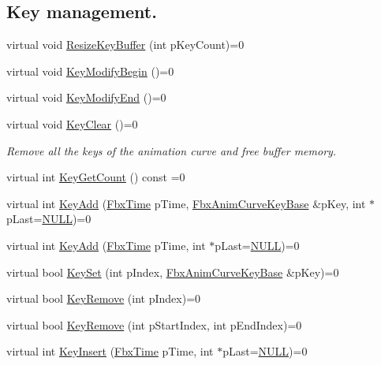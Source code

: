 \subsection*{Key management.}
\begin{DoxyCompactItemize}
\item 
virtual void \hyperlink{class_fbx_anim_curve_ad116802320381f4217d32dde6006643b}{Resize\+Key\+Buffer} (int p\+Key\+Count)=0
\item 
virtual void \hyperlink{class_fbx_anim_curve_ac75a9aaa2edc08635c0a9fadbd628923}{Key\+Modify\+Begin} ()=0
\item 
virtual void \hyperlink{class_fbx_anim_curve_ae8776e18ed1933e258774ba44f64fe5d}{Key\+Modify\+End} ()=0
\item 
virtual void \hyperlink{class_fbx_anim_curve_a202883ab5e1844beb60d40137464afd8}{Key\+Clear} ()=0
\begin{DoxyCompactList}\small\item\em Remove all the keys of the animation curve and free buffer memory. \end{DoxyCompactList}\item 
virtual int \hyperlink{class_fbx_anim_curve_a08de74d6ef6469be37abd1df0836eac9}{Key\+Get\+Count} () const =0
\item 
virtual int \hyperlink{class_fbx_anim_curve_aefac9bf8a5d7bf1fe147e192ba503737}{Key\+Add} (\hyperlink{class_fbx_time}{Fbx\+Time} p\+Time, \hyperlink{class_fbx_anim_curve_key_base}{Fbx\+Anim\+Curve\+Key\+Base} \&p\+Key, int $\ast$p\+Last=\hyperlink{fbxarch_8h_a070d2ce7b6bb7e5c05602aa8c308d0c4}{N\+U\+LL})=0
\item 
virtual int \hyperlink{class_fbx_anim_curve_a96e4e0437fc18712b785e7370ab5184e}{Key\+Add} (\hyperlink{class_fbx_time}{Fbx\+Time} p\+Time, int $\ast$p\+Last=\hyperlink{fbxarch_8h_a070d2ce7b6bb7e5c05602aa8c308d0c4}{N\+U\+LL})=0
\item 
virtual bool \hyperlink{class_fbx_anim_curve_a8f36f89bd5fbaa4f180789f4d9faf84f}{Key\+Set} (int p\+Index, \hyperlink{class_fbx_anim_curve_key_base}{Fbx\+Anim\+Curve\+Key\+Base} \&p\+Key)=0
\item 
virtual bool \hyperlink{class_fbx_anim_curve_a083206eda111aa4c6803410427a4645c}{Key\+Remove} (int p\+Index)=0
\item 
virtual bool \hyperlink{class_fbx_anim_curve_a7b4fe494d1ca4575bb253ec89f867df1}{Key\+Remove} (int p\+Start\+Index, int p\+End\+Index)=0
\item 
virtual int \hyperlink{class_fbx_anim_curve_aaad0086794bde7063d868956c6fc6b3f}{Key\+Insert} (\hyperlink{class_fbx_time}{Fbx\+Time} p\+Time, int $\ast$p\+Last=\hyperlink{fbxarch_8h_a070d2ce7b6bb7e5c05602aa8c308d0c4}{N\+U\+LL})=0

\end{DoxyCompactItemize}
